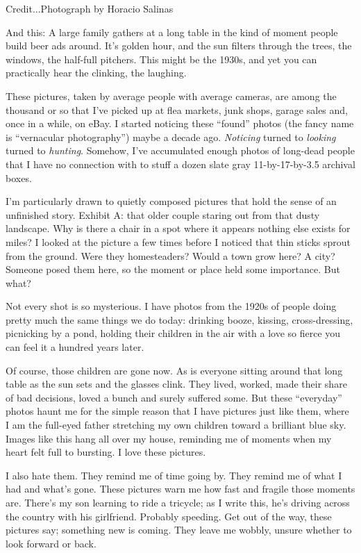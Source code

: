 Credit...Photograph by Horacio Salinas

And this: A large family gathers at a long table in the kind of moment
people build beer ads around. It's golden hour, and the sun filters
through the trees, the windows, the half-full pitchers. This might be
the 1930s, and yet you can practically hear the clinking, the laughing.

These pictures, taken by average people with average cameras, are among
the thousand or so that I've picked up at flea markets, junk shops,
garage sales and, once in a while, on eBay. I started noticing these
``found'' photos (the fancy name is ``vernacular photography'') maybe a
decade ago. \emph{Noticing} turned to \emph{looking} turned to
\emph{hunting}. Somehow, I've accumulated enough photos of long-dead
people that I have no connection with to stuff a dozen slate gray
11-by-17-by-3.5 archival boxes.

I'm particularly drawn to quietly composed pictures that hold the sense
of an unfinished story. Exhibit A: that older couple staring out from
that dusty landscape. Why is there a chair in a spot where it appears
nothing else exists for miles? I looked at the picture a few times
before I noticed that thin sticks sprout from the ground. Were they
homesteaders? Would a town grow here? A city? Someone posed them here,
so the moment or place held some importance. But what?

Not every shot is so mysterious. I have photos from the 1920s of people
doing pretty much the same things we do today: drinking booze, kissing,
cross-dressing, picnicking by a pond, holding their children in the air
with a love so fierce you can feel it a hundred years later.

Of course, those children are gone now. As is everyone sitting around
that long table as the sun sets and the glasses clink. They lived,
worked, made their share of bad decisions, loved a bunch and surely
suffered some. But these ``everyday'' photos haunt me for the simple
reason that I have pictures just like them, where I am the full-eyed
father stretching my own children toward a brilliant blue sky. Images
like this hang all over my house, reminding me of moments when my heart
felt full to bursting. I love these pictures.

I also hate them. They remind me of time going by. They remind me of
what I had and what's gone. These pictures warn me how fast and fragile
those moments are. There's my son learning to ride a tricycle; as I
write this, he's driving across the country with his girlfriend.
Probably speeding. Get out of the way, these pictures say; something new
is coming. They leave me wobbly, unsure whether to look forward or back.

